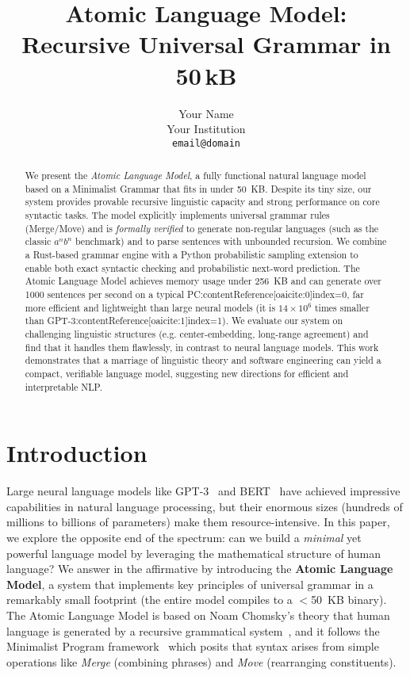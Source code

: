 \documentclass[11pt]{article}
\title{\textbf{Atomic Language Model:\\ Recursive Universal Grammar in 50\,kB}}
\author{Your Name \\ Your Institution \\ \texttt{email@domain}}
\date{}
\begin{document}
\maketitle

\begin{abstract}
We present the \emph{Atomic Language Model}, a fully functional natural language model based on a Minimalist Grammar that fits in under 50~KB. Despite its tiny size, our system provides provable recursive linguistic capacity and strong performance on core syntactic tasks. The model explicitly implements universal grammar rules (Merge/Move) and is \emph{formally verified} to generate non-regular languages (such as the classic $a^n b^n$ benchmark) and to parse sentences with unbounded recursion. We combine a Rust-based grammar engine with a Python probabilistic sampling extension to enable both exact syntactic checking and probabilistic next-word prediction. The Atomic Language Model achieves memory usage under 256~KB and can generate over 1000 sentences per second on a typical PC:contentReference[oaicite:0]{index=0}, far more efficient and lightweight than large neural models (it is $14{\times}10^6$ times smaller than GPT-3:contentReference[oaicite:1]{index=1}). We evaluate our system on challenging linguistic structures (e.g. center-embedding, long-range agreement) and find that it handles them flawlessly, in contrast to neural language models. This work demonstrates that a marriage of linguistic theory and software engineering can yield a compact, verifiable language model, suggesting new directions for efficient and interpretable NLP.
\end{abstract}

\section{Introduction}
Large neural language models like GPT-3~\cite{brown2020} and BERT~\cite{devlin2019} have achieved impressive capabilities in natural language processing, but their enormous sizes (hundreds of millions to billions of parameters) make them resource-intensive. In this paper, we explore the opposite end of the spectrum: can we build a \emph{minimal} yet powerful language model by leveraging the mathematical structure of human language? We answer in the affirmative by introducing the \textbf{Atomic Language Model}, a system that implements key principles of universal grammar in a remarkably small footprint (the entire model compiles to a $<$50~KB binary). The Atomic Language Model is based on Noam Chomsky's theory that human language is generated by a recursive grammatical system~\cite{chomsky1956}, and it follows the Minimalist Program framework~\cite{chomsky1995} which posits that syntax arises from simple operations like \emph{Merge} (combining phrases) and \emph{Move} (rearranging constituents).
\end{document}
